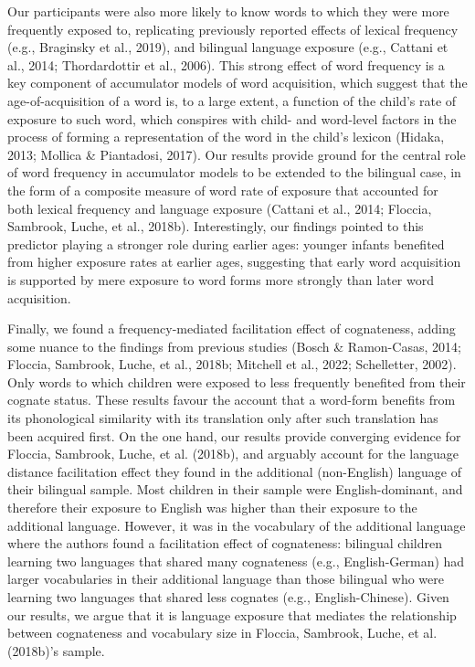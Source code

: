 \documentclass[
  man,
  floatsintext,
  colorlinks=true,linkcolor=blue,citecolor=blue,urlcolor=blue,biblatex]{apa7}
\begin{document}
Our participants were also more likely to know words to which they were
more frequently exposed to, replicating previously reported effects of
lexical frequency (e.g., Braginsky et al., 2019), and bilingual language
exposure (e.g., Cattani et al., 2014; Thordardottir et al., 2006). This
strong effect of word frequency is a key component of accumulator models
of word acquisition, which suggest that the age-of-acquisition of a word
is, to a large extent, a function of the child's rate of exposure to
such word, which conspires with child- and word-level factors in the
process of forming a representation of the word in the child's lexicon
(Hidaka, 2013; Mollica \& Piantadosi, 2017). Our results provide ground
for the central role of word frequency in accumulator models to be
extended to the bilingual case, in the form of a composite measure of
word rate of exposure that accounted for both lexical frequency and
language exposure (Cattani et al., 2014; Floccia, Sambrook, Luche, et
al., 2018b). Interestingly, our findings pointed to this predictor
playing a stronger role during earlier ages: younger infants benefited
from higher exposure rates at earlier ages, suggesting that early word
acquisition is supported by mere exposure to word forms more strongly
than later word acquisition.

Finally, we found a frequency-mediated facilitation effect of
cognateness, adding some nuance to the findings from previous studies
(Bosch \& Ramon-Casas, 2014; Floccia, Sambrook, Luche, et al., 2018b;
Mitchell et al., 2022; Schelletter, 2002). Only words to which children
were exposed to less frequently benefited from their cognate status.
These results favour the account that a word-form benefits from its
phonological similarity with its translation only after such translation
has been acquired first. On the one hand, our results provide converging
evidence for Floccia, Sambrook, Luche, et al. (2018b), and arguably
account for the language distance facilitation effect they found in the
additional (non-English) language of their bilingual sample. Most
children in their sample were English-dominant, and therefore their
exposure to English was higher than their exposure to the additional
language. However, it was in the vocabulary of the additional language
where the authors found a facilitation effect of cognateness: bilingual
children learning two languages that shared many cognateness (e.g.,
English-German) had larger vocabularies in their additional language
than those bilingual who were learning two languages that shared less
cognates (e.g., English-Chinese). Given our results, we argue that it is
language exposure that mediates the relationship between cognateness and
vocabulary size in Floccia, Sambrook, Luche, et al. (2018b)'s sample.
\end{document}

